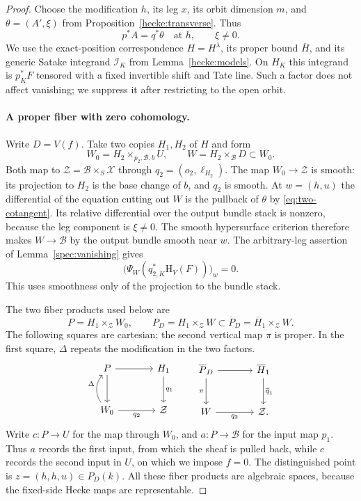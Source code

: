 \begin{proof}
Choose the modification $h$, its leg $x$, its orbit dimension $m$,
and $\theta=(A',\xi)$ from Proposition~\ref{hecke:transverse}.
Thus
\begin{equation}
 \label{eq:two-cotangent}
 p^*A=q^*\theta\quad\text{at }h,
 \qquad \xi\ne0.
\end{equation}
We use the exact-position correspondence $H=H^\lambda$, its proper
bound $\overline H$, and its generic Satake integrand
$\mathcal I_K$ from Lemma~\ref{hecke:models}.
On $H_K$ this integrand is $p_K^*F$ tensored with a fixed invertible
shift and Tate line. Such a factor does not affect vanishing;
we suppress it after restricting to the open orbit.

\paragraph{A proper fiber with zero cohomology.}
Write $D=V(f)$. Take two copies $H_1,H_2$ of $H$ and form
\[
 W_0=H_2\times_{p_2,\mathcal B,b}U,
 \qquad W=H_2\times_{\mathcal B}D\subset W_0.
\]
Both map to $\mathcal Z=\mathcal B\times_S\mathscr X$ through
$q_2=(o_2,\ell_{H_2})$. The map $W_0\to\mathcal Z$ is smooth:
its projection to $H_2$ is the base change of $b$, and $q_2$ is
smooth. At $w=(h,u)$ the differential of the equation cutting
out $W$ is the pullback of $\theta$ by
\eqref{eq:two-cotangent}. Its relative differential over the
output bundle stack is nonzero, because the leg component is
$\xi\ne0$. The smooth hypersurface criterion therefore makes
$W\to\mathcal B$ by the output bundle smooth near $w$.
The arbitrary-leg assertion of Lemma~\ref{spec:vanishing} gives
\begin{equation}
 \label{eq:two-hecke-zero}
 \bigl(\Psi_W(q_{2,K}^*\mathrm H_V(F))\bigr)_w=0.
\end{equation}
This uses smoothness only of the projection to the bundle stack.

The two fiber products used below are
\[
 P=H_1\times_{\mathcal Z}W_0,
 \qquad
 P_D=H_1\times_{\mathcal Z}W
       \subset\overline P_D=\overline H_1\times_{\mathcal Z}W.
\]
The following squares are cartesian; the second vertical map
$\pi$ is proper. In the first square, $\Delta$ repeats the
modification in the two factors.
\[
\begin{tikzcd}[column sep=large,row sep=large]
 P \arrow[r] \arrow[d] & H_1 \arrow[d,"q_1"] \\
 W_0 \arrow[r,"q_2"'] \arrow[u,bend left=38,"\Delta"]
       & \mathcal Z
\end{tikzcd}
\qquad
\begin{tikzcd}[column sep=large,row sep=large]
 \overline P_D \arrow[r] \arrow[d,"\pi"']
       & \overline H_1 \arrow[d,"\overline q_1"] \\
 W \arrow[r,"q_2"'] & \mathcal Z.
\end{tikzcd}
\]
Write $c:P\to U$ for the map through $W_0$, and
$a:P\to\mathcal B$ for the input map $p_1$.
Thus $a$ records the first input, from which the sheaf is pulled back,
while $c$ records the second input in $U$, on which we impose $f=0$.
The distinguished point is $z=(h,h,u)\in P_D(k)$.
All these fiber products are algebraic spaces, because the
fixed-side Hecke maps are representable.


\end{proof}
